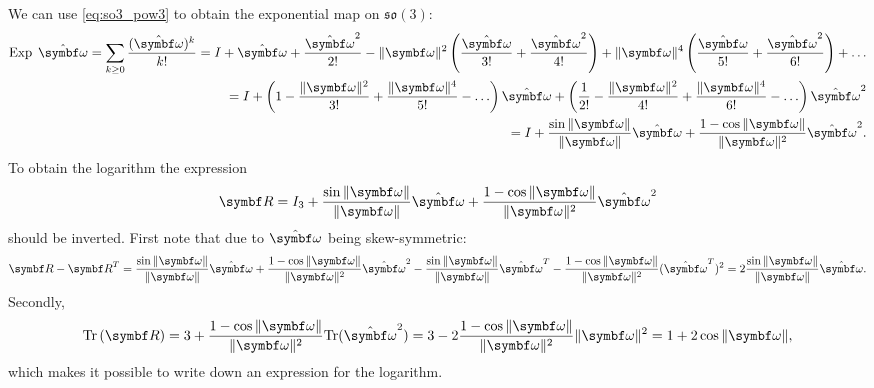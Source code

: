 We can use \eqref{eq:so3_pow3} to obtain the exponential map on $\mathfrak{so}(3)$:
\begin{equation}
  \begin{aligned}
    \Exp \; \hat {\bomega} = \sum_{k \geq 0} \frac{(\hat {\bomega})^k}{k!} = I + \hat{\bomega} + \frac{\hat{\bomega}^2}{2!} - \| \bomega \|^2 \left( \frac{\hat {\bomega}}{3!} + \frac{\hat {\bomega}^2}{4!} \right) + \| \bomega \|^4 \left( \frac{\hat {\bomega}}{5!} + \frac{\hat {\bomega}^2}{6!} \right) + \ldots \\
    = I + \left( 1 - \frac{\|\bomega \|^2}{3!} + \frac{\|\bomega \|^4}{5!} - \ldots \right) \hat{\bomega} + \left( \frac{1}{2!} - \frac{\|\bomega \|^2}{4!} + \frac{\|\bomega \|^4}{6!} - \ldots \right) \hat{\bomega}^2                                                                                               \\
    = I + \frac{\sin \| \bomega \|}{\|\bomega \|} \hat {\bomega} + \frac{1 - \cos \| \bomega \|}{\| \bomega \|^2} \hat {\bomega}^2.
  \end{aligned}
\end{equation}
To obtain the logarithm the expression
\begin{equation}
  \bR = I_3 + \frac{\sin \| \bomega \|}{\|\bomega \|} \hat {\bomega} + \frac{1 - \cos \| \bomega \|}{\| \bomega \|^2} \hat {\bomega}^2
\end{equation}
should be inverted. First note that due to $\hat \bomega$ being skew-symmetric:
\begin{equation}
  \label{eq:so3_log_deriv1}
  \bR - \bR^T =  \frac{\sin \| \bomega \|}{\|\bomega \|} \hat {\bomega} + \frac{1 - \cos \| \bomega \|}{\| \bomega \|^2} \hat {\bomega}^2 - \frac{\sin \| \bomega \|}{\|\bomega \|} \hat {\bomega} ^T - \frac{1 - \cos \| \bomega \|}{\| \bomega \|^2} (\hat {\bomega}^T)^2 = 2 \frac{\sin \|\bomega \|}{\| \bomega \|} \hat \bomega.
\end{equation}
Secondly,
\begin{equation}
  \label{eq:so3_log_deriv2}
  \tr \left(\bR  \right) = 3 + \frac{1 - \cos \| \bomega \|}{\|\bomega \|^2} \tr(\hat \bomega^2) =3 - 2 \frac{1 - \cos \| \bomega \|}{\|\bomega \|^2} \| \bomega \|^2 = 1 + 2 \cos \| \bomega \|,
\end{equation}
which makes it possible to write down an expression for the logarithm.

